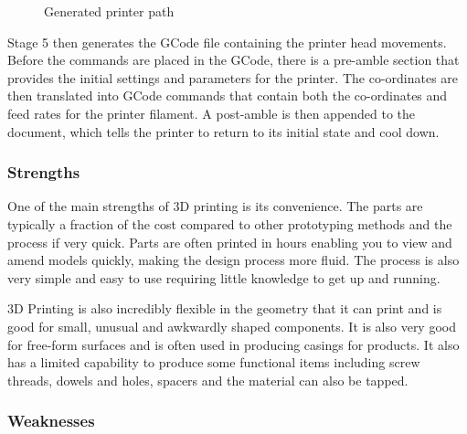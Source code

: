 \begin{figure}[h!]
    \caption{Generated printer path}\label{fig-printer-path}
\end{figure}

Stage 5 then generates the GCode file containing the printer head movements. Before the commands are placed in the GCode, there is a pre-amble section that provides the initial settings and parameters for the printer. The co-ordinates are then translated into GCode commands that contain both the co-ordinates and feed rates for the printer filament. A post-amble is then appended to the document, which tells the printer to return to its initial state and cool down.


\subsubsection{Strengths}

One of the main strengths of 3D printing is its convenience. The parts are typically a fraction of the cost compared to other prototyping methods and the process if very quick. Parts are often printed in hours enabling you to view and amend models quickly, making the design process more fluid. The process is also very simple and easy to use requiring little knowledge to get up and running. 

3D Printing is also incredibly flexible in the geometry that it can print and is good for small, unusual and awkwardly shaped components. It is also very good for free-form surfaces and is often used in producing casings for products. It also has a limited capability to produce some functional items including screw threads, dowels and holes, spacers and the material can also be tapped.

\subsubsection{Weaknesses}

